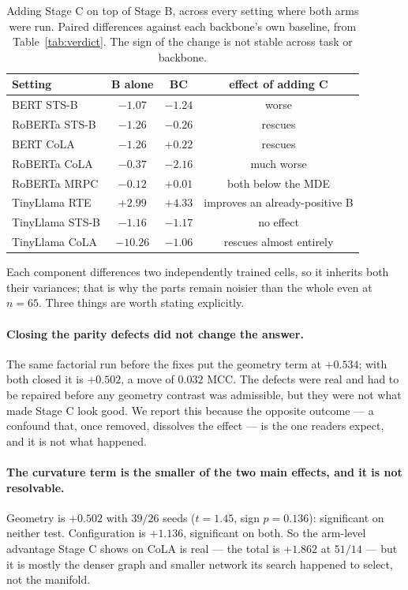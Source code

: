 \documentclass{article}
\begin{document}
\begin{table}[h]
\caption{Adding Stage C on top of Stage B, across every setting where both
arms were run. Paired differences against each backbone's own baseline, from
Table~\ref{tab:verdict}. The sign of the change is not stable across task or
backbone.}
\label{tab:bxc}
\begin{center}
\small
\begin{tabular}{lccc}
\toprule
Setting & B alone & BC & effect of adding C \\
\midrule
BERT STS-B      & $-1.07$ & $-1.24$ & worse \\
RoBERTa STS-B   & $-1.26$ & $-0.26$ & rescues \\
BERT CoLA       & $-1.26$ & $+0.22$ & rescues \\
RoBERTa CoLA    & $-0.37$ & $-2.16$ & much worse \\
RoBERTa MRPC    & $-0.12$ & $+0.01$ & both below the MDE \\
TinyLlama RTE   & $+2.99$ & $+4.33$ & improves an already-positive B \\
TinyLlama STS-B & $-1.16$ & $-1.17$ & no effect \\
TinyLlama CoLA  & $-10.26$ & $-1.06$ & rescues almost entirely \\
\bottomrule
\end{tabular}
\end{center}
\end{table}

Each component differences two independently trained cells, so it inherits both
their variances; that is why the parts remain noisier than the whole even at
$n=65$. Three things are worth stating explicitly.

\paragraph{Closing the parity defects did not change the answer.} The same
factorial run before the fixes put the geometry term at $+0.534$; with both
closed it is $+0.502$, a move of $0.032$ MCC. The defects were real and had to
be repaired before any geometry contrast was admissible, but they were not what
made Stage C look good. We report this because the opposite outcome --- a
confound that, once removed, dissolves the effect --- is the one readers expect,
and it is not what happened.

\paragraph{The curvature term is the smaller of the two main effects, and it is
not resolvable.} Geometry is $+0.502$ with $39/26$ seeds ($t=1.45$, sign
$p=0.136$): significant on neither test. Configuration is $+1.136$, significant
on both. So the arm-level advantage Stage C shows on CoLA is real --- the total
is $+1.862$ at $51/14$ --- but it is mostly the denser graph and smaller network
its search happened to select, not the manifold.
\end{document}
